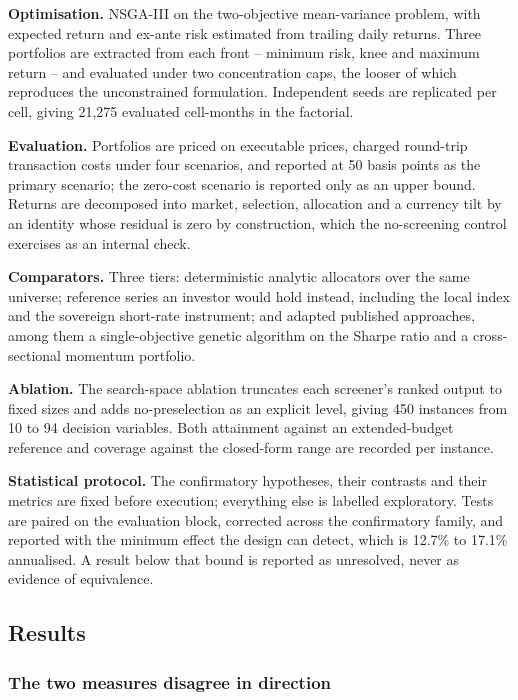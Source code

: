 \documentclass[preprint,11pt,authoryear]{elsarticle}
\begin{document}
\textbf{Optimisation.} NSGA-III on the two-objective mean-variance problem, with expected return and ex-ante risk estimated from trailing daily returns. Three portfolios are extracted from each front -- minimum risk, knee and maximum return -- and evaluated under two concentration caps, the looser of which reproduces the unconstrained formulation. Independent seeds are replicated per cell, giving 21,275 evaluated cell-months in the factorial.

\textbf{Evaluation.} Portfolios are priced on executable prices, charged round-trip transaction costs under four scenarios, and reported at 50 basis points as the primary scenario; the zero-cost scenario is reported only as an upper bound. Returns are decomposed into market, selection, allocation and a currency tilt by an identity whose residual is zero by construction, which the no-screening control exercises as an internal check.

\textbf{Comparators.} Three tiers: deterministic analytic allocators over the same universe; reference series an investor would hold instead, including the local index and the sovereign short-rate instrument; and adapted published approaches, among them a single-objective genetic algorithm on the Sharpe ratio and a cross-sectional momentum portfolio.

\textbf{Ablation.} The search-space ablation truncates each screener's ranked output to fixed sizes and adds no-preselection as an explicit level, giving 450 instances from 10 to 94 decision variables. Both attainment against an extended-budget reference and coverage against the closed-form range are recorded per instance.

\textbf{Statistical protocol.} The confirmatory hypotheses, their contrasts and their metrics are fixed before execution; everything else is labelled exploratory. Tests are paired on the evaluation block, corrected across the confirmatory family, and reported with the minimum effect the design can detect, which is 12.7\% to 17.1\% annualised. A result below that bound is reported as unresolved, never as evidence of equivalence.


\subsection{Results}\label{sec:results}

\subsubsection{The two measures disagree in direction}
\end{document}

